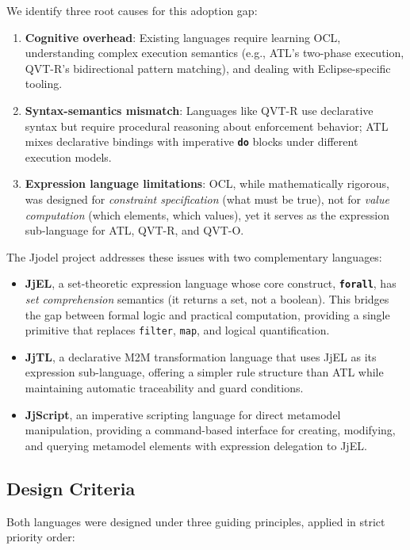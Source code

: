 \documentclass[11pt,a4paper]{article}
\newcommand{\jjscript}{\textsf{JjScript}}
\newcommand{\jjel}{\textsf{JjEL}}
\newcommand{\jjtl}{\textsf{JjTL}}
\newcommand{\kw}[1]{\texttt{\textbf{#1}}}
\begin{document}
We identify three root causes for this adoption gap:

\begin{enumerate}[label=(\roman*)]
    \item \textbf{Cognitive overhead}: Existing languages require learning OCL, understanding complex execution semantics (e.g., ATL's two-phase execution, QVT-R's bidirectional pattern matching), and dealing with Eclipse-specific tooling.
    \item \textbf{Syntax-semantics mismatch}: Languages like QVT-R use declarative syntax but require procedural reasoning about enforcement behavior; ATL mixes declarative bindings with imperative \kw{do} blocks under different execution models.
    \item \textbf{Expression language limitations}: OCL, while mathematically rigorous, was designed for \emph{constraint specification} (what must be true), not for \emph{value computation} (which elements, which values), yet it serves as the expression sub-language for ATL, QVT-R, and QVT-O.
\end{enumerate}

The Jjodel project addresses these issues with two complementary languages:

\begin{itemize}
    \item \textbf{\jjel{}}, a set-theoretic expression language whose core construct, \kw{forall}, has \emph{set comprehension} semantics (it returns a set, not a boolean). This bridges the gap between formal logic and practical computation, providing a single primitive that replaces \texttt{filter}, \texttt{map}, and logical quantification.
    \item \textbf{\jjtl{}}, a declarative M2M transformation language that uses \jjel{} as its expression sub-language, offering a simpler rule structure than ATL while maintaining automatic traceability and guard conditions.
    \item \textbf{\jjscript{}}, an imperative scripting language for direct metamodel manipulation, providing a command-based interface for creating, modifying, and querying metamodel elements with expression delegation to \jjel{}.
\end{itemize}

\subsection{Design Criteria}

Both languages were designed under three guiding principles, applied in strict priority order:
\end{document}

